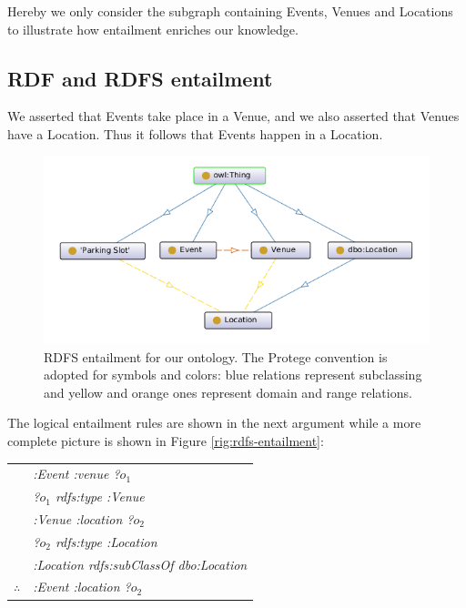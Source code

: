 \documentclass[runningheads,a4paper]{../../StyleFiles/llncs}
\begin{document}
Hereby we only consider the subgraph containing Events, Venues and Locations to illustrate how entailment enriches our knowledge. 


\subsection{RDF and RDFS entailment}
We asserted that Events take place in a Venue, and we also asserted that Venues have a Location. Thus it follows that Events happen in a Location.


\begin{figure}[h]
	\centering
	\includegraphics[width=1\textwidth]{img/ontology-classes.png}
	\caption{RDFS entailment for our ontology. The Protege convention is adopted
	for symbols and colors: blue relations represent subclassing and yellow and
	orange ones represent domain and range relations.}
	\label{fig:rdfs-entailment}
\end{figure}

The logical entailment rules are shown in the next argument while a more
complete picture is shown in Figure \ref{rig:rdfs-entailment}:

\begin{center}
	\begin{tabular}{c@{\,}l@{}} 
  	& \textit{:Event 		:venue 				?$o_1$} \\
  	& \textit{?$o_1$ 		rdfs:type 			:Venue} \\   
  	& \textit{:Venue 		:location 			?$o_2$} \\ 
  	& \textit{?$o_2$ 		rdfs:type 			:Location} \\ 
  	& \textit{:Location		rdfs:subClassOf 	dbo:Location} \\
  	  	\arrayrulecolor{blue} \cline{2-2}
  	$\therefore$         
  	& \textit{:Event 		:location 				?$o_2$} \\
  	\end{tabular}
\end{center}
\end{document}
